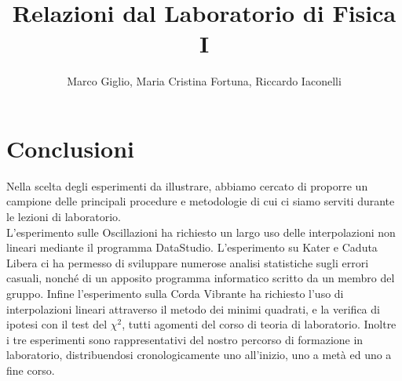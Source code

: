 \documentclass[a4paper,10pt]{report}
\author{Marco Giglio, Maria Cristina Fortuna, Riccardo Iaconelli}
\title{Relazioni dal Laboratorio di Fisica I}
\begin{document}
\maketitle

\tableofcontents

%
%
%
%
%
%
%

%
%
\chapter*{Conclusioni}
Nella scelta degli esperimenti da illustrare, abbiamo cercato di proporre un campione delle principali procedure e metodologie di cui ci siamo serviti durante le lezioni di laboratorio.\\
L'esperimento sulle Oscillazioni ha richiesto un largo uso delle interpolazioni non lineari mediante il programma DataStudio.
L'esperimento su Kater e Caduta Libera ci ha permesso di sviluppare numerose analisi statistiche sugli errori casuali, nonché di un apposito programma informatico scritto da un membro del gruppo.
Infine l'esperimento sulla Corda Vibrante ha richiesto l'uso di interpolazioni lineari attraverso il metodo dei minimi quadrati, e la verifica di ipotesi con il test del $\chi^2$, tutti agomenti del corso di teoria di laboratorio.
Inoltre i tre esperimenti sono rappresentativi del nostro percorso di formazione in laboratorio, distribuendosi cronologicamente uno all'inizio, uno a metà ed uno a fine corso.   
\end{document}

